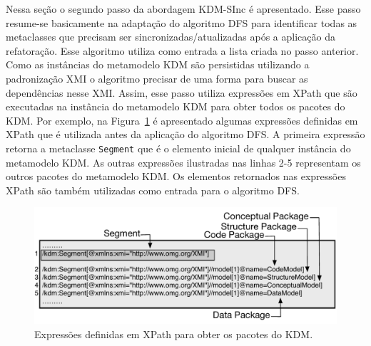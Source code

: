 Nessa seção o segundo passo da abordagem KDM-SInc é apresentado. Esse passo resume-se basicamente na adaptação do algoritmo DFS para identificar todas as metaclasses que precisam ser sincronizadas/atualizadas após a aplicação da refatoração. Esse algoritmo utiliza como entrada a lista criada no passo anterior. Como as instâncias do metamodelo KDM são persistidas utilizando a padronização XMI o algoritmo precisar de uma forma para buscar as dependências nesse XMI. Assim, esse passo utiliza expressões em XPath que são executadas na instância do metamodelo KDM para obter todos os pacotes do KDM. Por exemplo, na Figura~\ref{fig:xpath_queries} é apresentado algumas expressões definidas em XPath que é utilizada antes da aplicação do algoritmo DFS. A primeira expressão retorna a metaclasse \texttt{Segment} que é o elemento inicial de qualquer instância do metamodelo KDM. As outras expressões ilustradas nas linhas 2-5 representam os outros pacotes do metamodelo KDM. Os elementos retornados nas expressões XPath são também utilizadas como entrada para o algoritmo DFS.

\begin{figure}[h]
	\centering
	\caption{Expressões definidas em XPath para obter os pacotes do KDM.}
	\label{fig:xpath_queries}
	\includegraphics[scale=0.68]{images/queiresANDATLSBESNew}
	\fautor
\end{figure}

